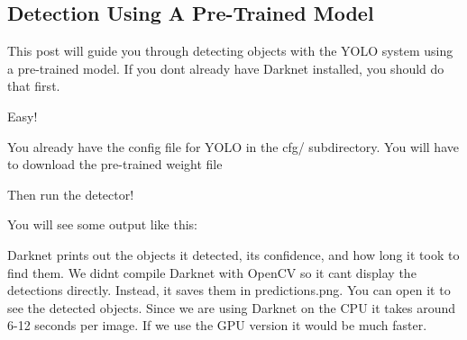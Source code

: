 \subsection*{Detection Using A Pre-\/\+Trained Model}

This post will guide you through detecting objects with the Y\+O\+LO system using a pre-\/trained model. If you don\textquotesingle{}t already have Darknet installed, you should do that first.


\begin{DoxyCode}{0}
\end{DoxyCode}


Easy!

You already have the config file for Y\+O\+LO in the cfg/ subdirectory. You will have to download the pre-\/trained weight file 
\begin{DoxyCode}{0}
\end{DoxyCode}
 Then run the detector!


\begin{DoxyCode}{0}
\end{DoxyCode}
 You will see some output like this\+:


\begin{DoxyCode}{0}
\end{DoxyCode}
 Darknet prints out the objects it detected, its confidence, and how long it took to find them. We didn\textquotesingle{}t compile Darknet with Open\+CV so it can\textquotesingle{}t display the detections directly. Instead, it saves them in predictions.\+png. You can open it to see the detected objects. Since we are using Darknet on the C\+PU it takes around 6-\/12 seconds per image. If we use the G\+PU version it would be much faster.

